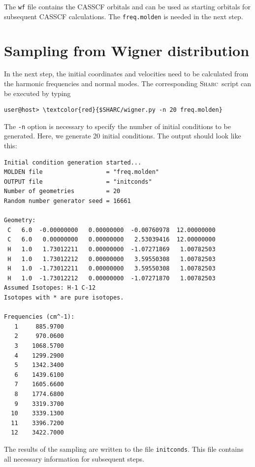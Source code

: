 \documentclass[a4paper,11pt,DIV=15,openany]{scrbook}
\newcommand{\sharc}{\textsc{Sharc}}
\newcommand{\ttt}[1]{\texttt{#1}}
\begin{document}
\normalsize
The \ttt{wf} file contains the CASSCF orbitals and can be used as starting orbitals for subsequent CASSCF calculations. The \ttt{freq.molden} is needed in the next step.

\clearpage
\section{Sampling from Wigner distribution}

In the next step, the initial coordinates and velocities need to be calculated from the harmonic frequencies and normal modes. The corresponding \sharc\ script can be executed by typing
\begin{Verbatim}[commandchars=\\\{\}]
user@host> \textcolor{red}{$SHARC/wigner.py -n 20 freq.molden}
\end{Verbatim}
The \ttt{-n} option is necessary to specify the number of initial conditions to be generated. Here, we generate 20 initial conditions. The output should look like this:
\begin{oframed}
\footnotesize\begin{Verbatim}[commandchars=\\\{\}]
Initial condition generation started...
MOLDEN file                  = "freq.molden"
OUTPUT file                  = "initconds"
Number of geometries         = 20
Random number generator seed = 16661

Geometry:
 C   6.0  -0.00000000   0.00000000  -0.00760978  12.00000000
 C   6.0   0.00000000   0.00000000   2.53039416  12.00000000
 H   1.0   1.73012211   0.00000000  -1.07271869   1.00782503
 H   1.0   1.73012212   0.00000000   3.59550308   1.00782503
 H   1.0  -1.73012211   0.00000000   3.59550308   1.00782503
 H   1.0  -1.73012212   0.00000000  -1.07271870   1.00782503
Assumed Isotopes: H-1 C-12 
Isotopes with * are pure isotopes.

Frequencies (cm^-1):
   1     885.9700
   2     970.0600
   3    1068.5700
   4    1299.2900
   5    1342.3400
   6    1439.6100
   7    1605.6600
   8    1774.6800
   9    3319.3700
  10    3339.1300
  11    3396.7200
  12    3422.7000
\end{Verbatim}
\end{oframed}

The results of the sampling are written to the file \ttt{initconds}. This file contains all necessary information for subsequent steps.

\normalsize
\end{document}
